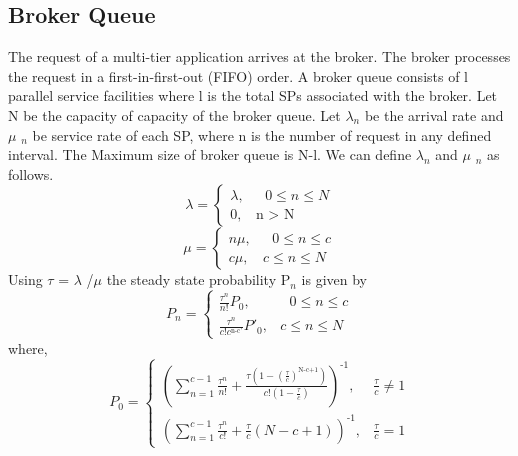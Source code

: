 \documentclass[12pt,a4paper,twoside,openright]{report}
\newcommand\tab[1][0.8cm]{\hspace*{#1}}
\begin{document}
\subsection{Broker Queue}
\tab The request of a multi-tier application arrives at the broker.
The broker processes the request in a first-in-first-out (FIFO)
order. A broker queue consists of l parallel service facilities
where l is the total SPs associated with the broker. Let N be
the capacity of capacity of the broker queue. Let $\lambda$$_n$ be the arrival rate and $\mu$ $_n$ be service rate of each
SP, where n is the number of request in any defined interval.
\newline
The Maximum size of broker queue is N-l. We can define 
$\lambda$$_n$ and $\mu$ $_n$ as follows.
\begin{equation}
{\lambda} =\begin{cases}
\lambda,& \text{ } 0\leq n\leq N\\
0,              & \text{n $>$ N}
\end{cases}
\end{equation}
\begin{equation}
{\mu} =\begin{cases}
n\mu,& \text{ } 0\leq n\leq c\\
c\mu,              & c\leq n\leq N
\end{cases}
\end{equation}
Using $\tau$ = $\lambda$ /$\mu$ the steady state probability P$_n$ is given by
\begin{equation}
P_n =\begin{cases}
\frac{\tau ^n}{n!}P_0,& \text{ } 0\leq n\leq c\\
\frac{\tau ^n}{c!c^{\text{n-c'}}}P'_0,              & c\leq n\leq N
\end{cases}
\end{equation}
where,
\begin{equation}
P_0 =\begin{cases}
( \sum_{n=1}^{c-1} \frac{\tau ^n}{n!}+ \frac{\tau(1-(\frac{\tau}{c})^{\text{N-c+1}})}{c!(1-\frac{\tau}{c})} )^{\text{-1}},& \frac{\tau}{c} \not= 1 \\
( \sum_{n=1}^{c-1}\frac{\tau ^n}{c!}+\frac{\tau}{c}(N-c+1))^{\text{-1}},              & \frac{\tau}{c} = 1
\end{cases}
\end{equation}
\end{document}
